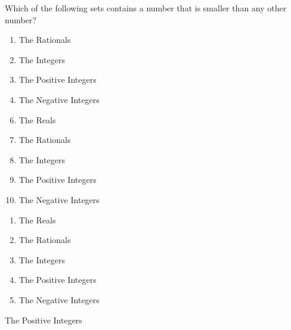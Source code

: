 


 Which of the following sets contains a number that is smaller than any other number? 


\ifsat
	\begin{enumerate}[label=\Alph*)]
		\item  The Rationals
		\item  The Integers
		\item  The Positive Integers%
		\item  The Negative Integers
	\end{enumerate}
\else
\fi

\ifacteven
	\begin{enumerate}[label=\textbf{\Alph*.},itemsep=\fill,align=left]
		\setcounter{enumii}{5}
		\item   The Reals
		\item  The Rationals
		\item  The Integers
		\addtocounter{enumii}{1}
		\item  The Positive Integers%
		\item  The Negative Integers
	\end{enumerate}
\else
\fi

\ifactodd
	\begin{enumerate}[label=\textbf{\Alph*.},itemsep=\fill,align=left]
		\item   The Reals
		\item  The Rationals
		\item  The Integers
		\item  The Positive Integers%
		\item  The Negative Integers
	\end{enumerate}
\else
\fi

\ifgridin
  The Positive Integers%
		
\else
\fi

